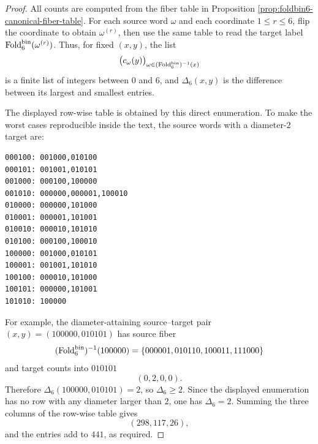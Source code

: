 \begin{proof}
All counts are computed from the fiber table in Proposition \ref{prop:foldbin6-canonical-fiber-table}.  For each source word \(\omega\) and each coordinate \(1\le r\le6\), flip the coordinate to obtain \(\omega^{(r)}\), then use the same table to read the target label \(\operatorname{Fold}_6^{\mathrm{bin}}(\omega^{(r)})\).  Thus, for fixed \((x,y)\), the list
\[
\bigl(c_\omega(y)\bigr)_{\omega\in(\operatorname{Fold}_6^{\mathrm{bin}})^{-1}(x)}
\]
is a finite list of integers between \(0\) and \(6\), and \(\Delta_6(x,y)\) is the difference between its largest and smallest entries.

The displayed row-wise table is obtained by this direct enumeration.  To make the worst cases reproducible inside the text, the source words with a diameter-\(2\) target are:
\begin{center}
\begin{minipage}{0.92\linewidth}
\begin{Verbatim}[breaklines=true,breakanywhere=true,fontsize=\scriptsize]
000100: 001000,010100
000101: 001001,010101
001000: 000100,100000
001010: 000000,000001,100010
010000: 000000,101000
010001: 000001,101001
010010: 000010,101010
010100: 000100,100010
100000: 001000,010101
100001: 001001,101010
100100: 000010,101000
100101: 000000,101001
101010: 100000
\end{Verbatim}
\end{minipage}
\end{center}
For example, the diameter-attaining source--target pair \((x,y)=(100000,010101)\) has source fiber
\[
(\operatorname{Fold}_6^{\mathrm{bin}})^{-1}(100000)=\{000001,010110,100011,111000\}
\]
and target counts into \(010101\)
\[
(0,2,0,0).
\]
Therefore \(\Delta_6(100000,010101)=2\), so \(\Delta_6\ge2\).  Since the displayed enumeration has no row with any diameter larger than \(2\), one has \(\Delta_6=2\).  Summing the three columns of the row-wise table gives
\[
(298,117,26),
\]
and the entries add to \(441\), as required.


\end{proof}

